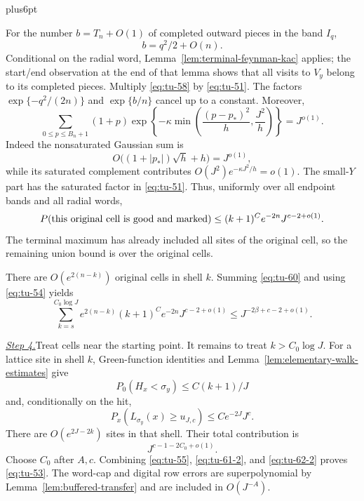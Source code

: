 \documentclass[12pt,reqno]{amsart}
\makeatletter
\theoremstyle{plain}
\theoremstyle{definition}
\theoremstyle{remark}
\renewenvironment{proof}[1][\proofname]{%
  \par
  \pushQED{\qed}%
  \normalfont
  \topsep6pt plus6pt\relax
  \trivlist
  \item[\hskip\labelsep\slshape #1\@addpunct{.}]%
  \ignorespaces
}{%
  \popQED
  \endtrivlist
  \@endpefalse
}
\DeclareRobustCommand{\qed}{%
  \leavevmode\unskip\penalty9999\hbox{}\nobreak
  \ifmmode
    \makebox[0pt][l]{\qquad\hbox{\qedsymbol}}%
  \else
    \qquad\hbox{\qedsymbol}%
  \fi
}
\renewcommand{\qedsymbol}{\rule[.47pt]{4pt}{6pt}}
\numberwithin{equation}{section}
\makeatother
\begin{document}
\begin{proof}[Proof of Proposition~\ref{prop:localized-disk-upper}]
For the number \(b=T_n+O(1)\) of completed outward pieces in the band
\(I_q\),
\[
       b=q^2/2+O(n).
\]
Conditional on the radial word, Lemma~\ref{lem:terminal-feynman-kac} applies;
the start/end observation at the end of that lemma shows that all visits
to \(V_y\) belong to its completed pieces.  Multiply
\eqref{eq:tu-58} by \eqref{eq:tu-51}.  The factors
\(\exp\{-q^2/(2n)\}\) and \(\exp\{b/n\}\) cancel up to a constant.
Moreover,
\begin{equation}
 \sum_{0\le p\le B_n+1}(1+p)
 \exp\left\{-\kappa\min\left(
          \frac{(p-p_*)^2}{h},\frac{J^2}{h}\right)\right\}
       =J^{o(1)}.                                             \label{eq:tu-59}
\end{equation}
Indeed the nonsaturated Gaussian sum is
\[
 O\bigl((1+|p_*|)\sqrt h+h\bigr)=J^{o(1)},
\]
while its saturated complement contributes
\(O(J^2)e^{-\kappa J^2/h}=o(1)\).  The small-\(Y\) part has the
saturated factor in \eqref{eq:tu-51}.  Thus, uniformly
over all endpoint bands and all radial words,
\begin{equation}
 P(\hbox{this original cell is good and marked})
       \le (k+1)^Ce^{-2n}J^{c-2+o(1)}.                        \label{eq:tu-60}
\end{equation}
The terminal maximum has already included all sites of the original
cell, so the remaining union bound is over the original cells.

There are \(O(e^{2(n-k)})\) original cells in shell \(k\).  Summing \eqref{eq:tu-60}
and using \eqref{eq:tu-54} yields
\begin{equation}
 \sum_{k=s}^{C_0\log J}e^{2(n-k)}
       (k+1)^Ce^{-2n}J^{c-2+o(1)}
       \le J^{-2\beta+c-2+o(1)}.                              \label{eq:tu-61-2}
\end{equation}

\smallskip\noindent
\underline{\textit{Step 4.}}\quad Treat cells near the starting point.
It remains to treat \(k>C_0\log J\). For a lattice site in shell \(k\),
Green-function identities and Lemma~\ref{lem:elementary-walk-estimates} give
\[
 P_0(H_x<\sigma_y)\le C(k+1)/J
\]
and, conditionally on the hit,
\[
 P_x(L_{\sigma_y}(x)\ge u_{J,c})
       \le Ce^{-2J}J^c.
\]
There are \(O(e^{2J-2k})\) sites in that shell.  Their total contribution
is
\begin{equation}
       J^{c-1-2C_0+o(1)}.                                    \label{eq:tu-62-2}
\end{equation}
Choose \(C_0\) after \(A,c\).  Combining \eqref{eq:tu-55}, \eqref{eq:tu-61-2}, and \eqref{eq:tu-62-2} proves
\eqref{eq:tu-53}.  The word-cap and digital row errors are superpolynomial by
Lemma~\ref{lem:buffered-transfer} and are included in \(O(J^{-A})\).
\end{proof}
\end{document}
